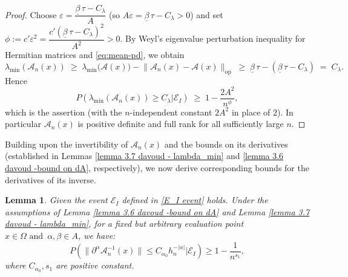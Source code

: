 \documentclass{article}
\newtheorem{lemma}{Lemma}
\begin{document}
\begin{proof}
Choose $\varepsilon=\dfrac{\underline{\beta}\,\tau-C_\lambda}{A}$ (so $A\varepsilon=\underline{\beta}\,\tau-C_\lambda>0$) and set $\phi:=c'\varepsilon^2=\dfrac{c'\left(\underline{\beta}\,\tau-C_\lambda\right)^2}{A^2}>0$.
By Weyl's eigenvalue perturbation inequality for Hermitian matrices and \eqref{eq:mean-pd}, we obtain 
\begin{equation}
    \lambda_{\min}(\mathscr{A}_n(x))\;\ge\;\lambda_{\min}\!\big(\mathscr{A}(x)\big)
-\big\|\mathscr{A}_n(x)-\mathscr{A}(x)\big\|_{\mathrm{op}}
\;\ge\;\underline{\beta}\,\tau-\left(\underline{\beta}\,\tau-C_\lambda\right)\;=\;C_\lambda .
\end{equation}
Hence
$$
P\!\left(\lambda_{\min}(\mathscr{A}_n(x))\ge C_\lambda \Big|\mathscr{E}_I\right)
\;\ge\;1-\frac{2A^2}{n^{\phi}} ,
$$
which is the assertion (with the $n$-independent constant $2A^2$ in place of $2$). In
particular $\mathscr{A}_n(x)$ is positive definite and full rank for all sufficiently large $n$.
\end{proof}

Building upon the invertibility of $\mathscr{A}_n(x)$	and the bounds on its derivatives (established in Lemmas \ref{lemma 3.7 davoud - lambda_min} and \ref{lemma 3.6 davoud -bound on dA}, respectively), we now derive corresponding bounds for the derivatives of its inverse.
\begin{lemma}
    Given the event $\mathscr{E}_I$ defined in \eqref{E_I event} holds. Under the assumptions of Lemma \ref{lemma 3.6 davoud -bound on dA} and Lemma \ref{lemma 3.7 davoud - lambda_min}, for a fixed but arbitrary evaluation point $x \in \Omega \,\,\text{and}\,\,\, \alpha, \beta \in A$, we have:
    \begin{equation}
    P\left(\|\partial^{\alpha} \mathscr{A}_n^{-1}(x)\| \leq C_{\alpha_0} h_n^{-\left|\alpha\right|} \Big| \mathscr{E}_I\right) \geq 1-\frac{1}{n^{s_1}},
    \end{equation}
    where $C_{\alpha_0},s_1$ are positive constant.
    \label{lemma 3.10 davoud - bound a^-1}
\end{lemma}
 
\end{document}
